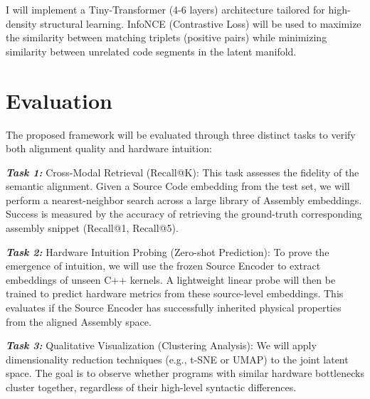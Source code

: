 \documentclass[11pt]{article}
\begin{document}
I will implement a Tiny-Transformer (4-6 layers) architecture tailored for high-density structural learning. InfoNCE (Contrastive Loss) will be used to maximize the similarity between matching triplets (positive pairs) while minimizing similarity between unrelated code segments in the latent manifold.

\section{Evaluation}
The proposed framework will be evaluated through three distinct tasks to verify both alignment quality and hardware intuition:

\textbf{\textit{Task 1:}} Cross-Modal Retrieval (Recall@K): This task assesses the fidelity of the semantic alignment. Given a Source Code embedding from the test set, we will perform a nearest-neighbor search across a large library of Assembly embeddings. Success is measured by the accuracy of retrieving the ground-truth corresponding assembly snippet (Recall@1, Recall@5).

\textbf{\textit{Task 2:}} Hardware Intuition Probing (Zero-shot Prediction): To prove the emergence of intuition, we will use the frozen Source Encoder to extract embeddings of unseen C++ kernels. A lightweight linear probe will then be trained to predict hardware metrics from these source-level embeddings. This evaluates if the Source Encoder has successfully inherited physical properties from the aligned Assembly space.

\textbf{\textit{Task 3:}} Qualitative Visualization (Clustering Analysis): We will apply dimensionality reduction techniques (e.g., t-SNE or UMAP) to the joint latent space. The goal is to observe whether programs with similar hardware bottlenecks cluster together, regardless of their high-level syntactic differences.


\end{document}
